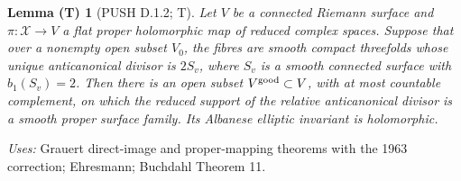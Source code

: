 \documentclass[11pt,a4paper]{article}
\theoremstyle{plain}
\newtheorem{lemma}[theorem]{Lemma (T)}
\theoremstyle{definition}
\begin{document}
\begin{lemma}[PUSH D.1.2; T]\label{push:D.1.2}
Let \(V\) be a connected Riemann surface and
\(\pi:\mathcal X\to V\) a flat proper holomorphic map of reduced
complex spaces. Suppose that over a nonempty open subset \(V_0\), the
fibres are smooth compact threefolds whose unique anticanonical divisor
is \(2S_v\), where \(S_v\) is a smooth connected surface with
\(b_1(S_v)=2\). Then there is an open subset \(V^{\rm good}\subset V\), with at
most countable complement, on which the reduced support of the
relative anticanonical divisor is a smooth proper surface family. Its
Albanese elliptic invariant is holomorphic.
\end{lemma}
\noindent\emph{Uses:} Grauert direct-image and proper-mapping theorems with the 1963 correction; Ehresmann; Buchdahl Theorem 11.\par
\end{document}
